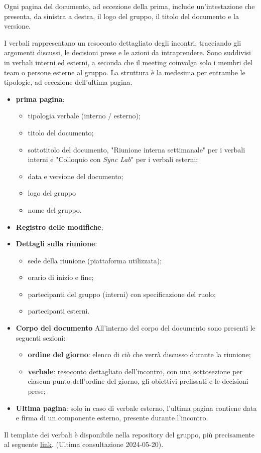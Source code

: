 Ogni pagina del documento, ad eccezione della prima, include un'intestazione che presenta, da sinistra a destra, il logo del gruppo, il titolo del documento e la versione.

I verbali rappresentano un resoconto dettagliato degli incontri, tracciando gli argomenti discussi, le decisioni prese e le azioni da intraprendere.
Sono suddivisi in verbali interni ed esterni, a seconda che il meeting coinvolga solo i membri del team o persone esterne al gruppo.
La struttura è la medesima per entrambe le tipologie, ad eccezione dell'ultima pagina.
\begin{itemize}
	\item \textbf{prima pagina}:
	      \begin{itemize}
		      \item tipologia verbale (interno / esterno);
		      \item titolo del documento;
		      \item sottotitolo del documento, "Riunione interna settimanale" per i verbali interni e "Colloquio con \textit{Sync Lab}" per i verbali esterni;
		      \item data e versione del documento;
		      \item logo del gruppo
		      \item nome del gruppo.
	      \end{itemize}
	\item \textbf{Registro delle modifiche};
	\item \textbf{Dettagli sulla riunione}:
	      \begin{itemize}
		      \item sede della riunione (piattaforma utilizzata);
		      \item orario di inizio e fine;
		      \item partecipanti del gruppo (interni) con specificazione del ruolo;
		      \item partecipanti esterni.
	      \end{itemize}
	\item \textbf{Corpo del documento}
	      All'interno del corpo del documento sono presenti le seguenti sezioni:
	      \begin{itemize}
		      \item \textbf{ordine del giorno}: elenco di ciò che verrà discusso durante la riunione;
		      \item \textbf{verbale}: resoconto dettagliato dell'incontro, con una sottosezione per ciascun punto dell'ordine del giorno,
		            gli obiettivi prefissati e le decisioni prese;
	      \end{itemize}
	\item \textbf{Ultima pagina}: solo in caso di verbale esterno, l'ultima pagina contiene data e firma di un componente esterno, presente durante l'incontro.
\end{itemize}
Il template dei verbali è disponibile nella repository del gruppo, più precisamente al seguente \href{https://github.com/7Last/docs/tree/develop/0_template}{\underline{link}}. (Ultima consultazione 2024-05-20).
\newpage
